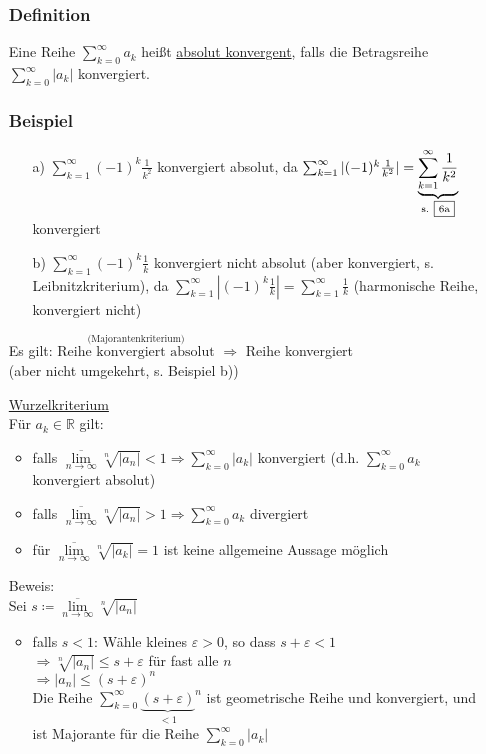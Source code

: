 \documentclass[12pt, titlepage]{article}
\newcommand{\R}{\mathds{R}}
\newcommand{\infn}{n\rightarrow\infty}
\renewcommand{\*}{\cdot}
\renewcommand{\epsilon}{\varepsilon}
\renewcommand{\limsup}[1]{\underset{#1}{\overline{\lim}}}
\begin{document}
\begin{itemize}
	\subsubsection*{Definition}
	Eine Reihe $\sum_{k=0}^{\infty}a_k$ heißt \underline{absolut konvergent}, falls die Betragsreihe $\sum_{k=0}^{\infty}|a_k|$ konvergiert.\\
	\subsubsection*{Beispiel}
	\begin{itemize}
		\item[a)] $\sum_{k=1}^{\infty}(-1)^k\frac{1}{k^2}$ konvergiert absolut, da $\sum_{k=1}^{\infty}|(-1)^k\frac{1}{k^2}|=\underbrace{\sum_{k=1}^{\infty}\frac{1}{k^2}}_{\textrm{s. \fbox{6a}}}$ konvergiert
		\item[b)] $\sum_{k=1}^{\infty}(-1)^k\frac{1}{k}$ konvergiert nicht absolut (aber konvergiert, s. Leibnitzkriterium), da $\sum_{k=1}^{\infty}|(-1)^k\frac{1}{k}|=\sum_{k=1}^{\infty}\frac{1}{k}$ (harmonische Reihe, konvergiert nicht)
	\end{itemize}
	Es gilt: $\overset{\textrm{(Majorantenkriterium)}}{\textrm{Reihe konvergiert absolut}}$ $\Rightarrow$ Reihe konvergiert\\
	(aber nicht umgekehrt, s. Beispiel b))
	\item[\fbox{6a}] \underline{Wurzelkriterium}\\
	Für $a_k\in\R$ gilt:
	\begin{itemize}
		\item falls $\limsup{\infn}\sqrt[n]{|a_n|}<1\Rightarrow\sum_{k=0}^{\infty}|a_k|$ konvergiert (d.h. $\sum_{k=0}^{\infty}a_k$ konvergiert absolut)
		\item falls $\limsup{\infn}\sqrt[n]{|a_n|}>1\Rightarrow\sum_{k=0}^{\infty}a_k$ divergiert
		\item für $\limsup{\infn}\sqrt[n]{|a_k|}=1$ ist keine allgemeine Aussage möglich
	\end{itemize}
	Beweis:\\
	Sei $s\coloneqq\limsup{\infn}\sqrt[n]{|a_n|}$
	\begin{itemize}
		\item falls $s<1$: Wähle kleines $\epsilon>0$, so dass $s+\epsilon<1$\\
		$\Rightarrow\sqrt[n]{|a_n|}\leq s+\epsilon$ für fast alle $n$\\
		$\Rightarrow|a_n|\leq(s+\epsilon)^n$\\
		Die Reihe $\sum_{k=0}^{\infty}{\underbrace{(s+\epsilon)}_{<1}}^n$ ist geometrische Reihe und konvergiert, und ist Majorante für die Reihe $\sum_{k=0}^{\infty}|a_k|$

\end{itemize}
\end{itemize}
\end{document}
